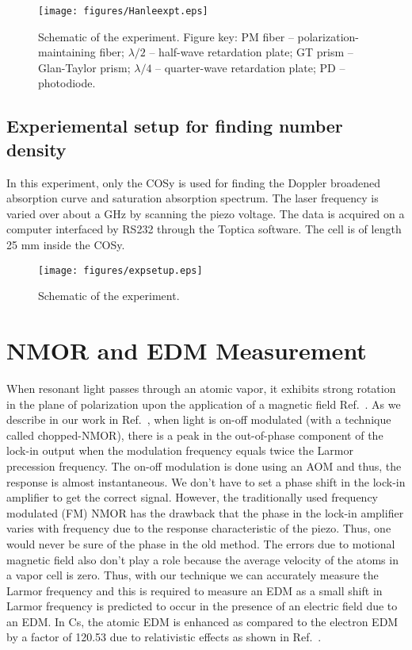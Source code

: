 \begin{figure*}[ht]
	\centering
	\texttt{[image: figures/Hanleexpt.eps]}
	\caption{Schematic of the experiment. Figure key: PM fiber -- polarization-maintaining fiber; $\lambda /2$ -- half-wave retardation plate; GT prism -- Glan-Taylor prism; $\lambda /4$ -- quarter-wave retardation plate; PD -- photodiode.}
	\label{fig:Hanleexpt}
\end{figure*}

\section{Experiemental setup for finding number density}

In this experiment, only the COSy is used for finding the Doppler broadened absorption curve and saturation absorption spectrum. The laser frequency is varied over about a GHz by scanning the piezo voltage. The data is acquired on a computer interfaced by RS232 through the Toptica software. The cell is of length 25 mm inside the COSy.
	
\begin{figure}[h!]
	\centering
	\texttt{[image: figures/expsetup.eps]}
	\caption{\label{fig:expsetup}Schematic of the experiment.}
\end{figure}

\chapter{NMOR and EDM Measurement}

When resonant light passes through an atomic vapor, it exhibits strong rotation in the plane of polarization upon the application of a magnetic field Ref.\ \cite{BGK02}. As we describe in our work in Ref.\ \cite{RCN11}, when light is on-off modulated (with a technique called chopped-NMOR), there is a peak in the out-of-phase component of the lock-in output when the modulation frequency equals twice the Larmor precession frequency. The on-off modulation is done using an AOM and thus, the response is almost instantaneous. We don't have to set a phase shift in the lock-in amplifier to get the correct signal. However, the traditionally used frequency modulated (FM) NMOR has the drawback that the phase in the lock-in amplifier varies with frequency due to the response characteristic of the piezo. Thus, one would never be sure of the phase in the old method. The errors due to motional magnetic field also don't play a role because the average velocity of the atoms in a vapor cell is zero. Thus, with our technique we can accurately measure the Larmor frequency and this is required to measure an EDM as a small shift in Larmor frequency is predicted to occur in the presence of an electric field due to an EDM. In Cs, the atomic EDM is enhanced as compared to the electron EDM by a factor of 120.53 due to relativistic effects as shown in Ref.\ \cite{NSD08}.

